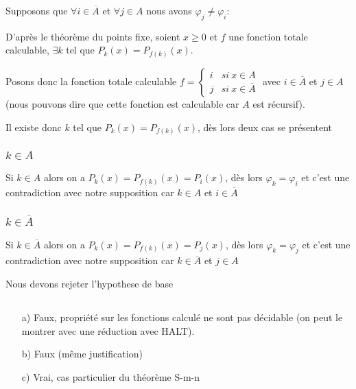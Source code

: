 Supposons que  $\forall i \in \overline{A}$ et $\forall j \in A$ nous avons $\varphi_j \neq \varphi_i$:

D'après le théorème du points fixe, soient $x \geq 0$ et $f$ une fonction totale calculable, $\exists k$ tel que $P_k(x) = P_{f(k)}(x)$.

Posons donc la fonction totale calculable $f =
\left\{
\begin{array}{ll}
i & si\ x \in A\\
j & si\ x \in \overline{A}
\end{array}
\right.
$ avec $i \in \overline{A}$ et $j \in A$ (nous pouvons dire que cette fonction est calculable car $A$ est récursif).

Il existe donc $k$ tel que $P_k(x) = P_{f(k)}(x)$, dès lors deux cas se présentent
\subsubsection*{$k \in A$}

Si $k \in A$ alors on a $P_k(x) = P_{f(k)}(x) = P_i(x)$, dès lors $\varphi_k = \varphi_i$ et c'est une contradiction avec notre supposition car $k \in A$ et $i\in \overline{A}$

\subsubsection*{$k \in \overline{A}$}

Si $k \in \overline{A}$ alors on a $P_k(x) = P_{f(k)}(x) = P_j(x)$, dès lors $\varphi_k = \varphi_j$ et c'est une contradiction avec notre supposition car $k \in \overline{A}$ et $j\in A$

Nous devons rejeter l'hypothese de base

\subsection{}

\begin{itemize}
	\item[a)] Faux, propriété sur les fonctions calculé ne sont pas décidable (on peut le montrer avec une réduction avec HALT).
	\item[b)] Faux (même justification)
	\item[c)] Vrai, cas particulier du théorème S-m-n
\end{itemize}